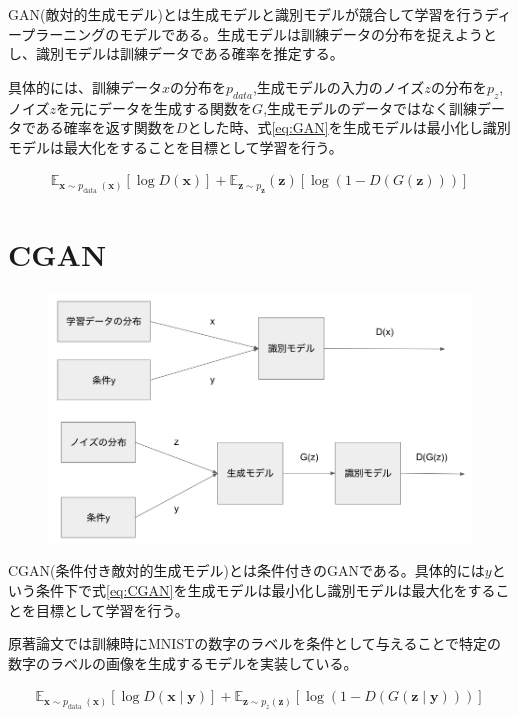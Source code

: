 GAN(敵対的生成モデル)とは生成モデルと識別モデルが競合して学習を行うディープラーニングのモデルである。生成モデルは訓練データの分布を捉えようとし、識別モデルは訓練データである確率を推定する。\par
具体的には、訓練データ$x$の分布を$p_{data}$,生成モデルの入力のノイズ$z$の分布を$p_z$,ノイズ$z$を元にデータを生成する関数を$G$,生成モデルのデータではなく訓練データである確率を返す関数を$D$とした時、式\ref{eq:GAN}を生成モデルは最小化し識別モデルは最大化をすることを目標として学習を行う\cite{GAN}。


\begin{align}
\label{eq:GAN}
    \mathbb{E}_{\boldsymbol{x} \sim p_{\text {data }}(\boldsymbol{x})}[\log D(\boldsymbol{x})]+\mathbb{E}_{\boldsymbol{z} \sim p_{\boldsymbol{z}}}(\boldsymbol{z})[\log (1-D(G(\boldsymbol{z})))]
\end{align}

\section{CGAN}

\begin{figure}[h]
    \includegraphics{figure/CGAN.png}
\end{figure}

CGAN(条件付き敵対的生成モデル)とは条件付きのGANである。具体的には$y$という条件下で式\ref{eq:CGAN}を生成モデルは最小化し識別モデルは最大化をすることを目標として学習を行う\cite{CGAN}。\par
原著論文では訓練時にMNISTの数字のラベルを条件として与えることで特定の数字のラベルの画像を生成するモデルを実装している。


\begin{align}
    \label{eq:CGAN}
    \mathbb{E}_{\boldsymbol{x} \sim p_{\text {data }}(\boldsymbol{x})}[\log D(\boldsymbol{x} \mid \boldsymbol{y})]+\mathbb{E}_{\boldsymbol{z} \sim p_{z}(\boldsymbol{z})}[\log (1-D(G(\boldsymbol{z} \mid \boldsymbol{y})))]
\end{align}


